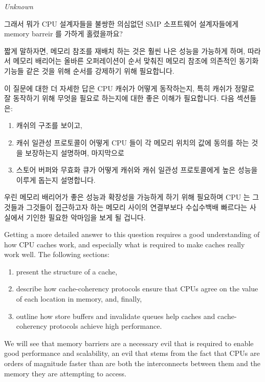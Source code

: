 
%
	 {\emph{Unknown}}

그래서 뭐가 CPU 설계자들을 불쌍한 의심없던 SMP 소프트웨어 설계자들에게
memory barreir 를 가하게 홀렸을까요?

짧게 말하자면, 메모리 참조를 재배치 하는 것은 훨씬 나은 성능을 가능하게
하며, 따라서 메모리 배리어는 올바른 오퍼레이션이 순서 맞춰진 메모리 참조에
의존적인 동기화 기능들 같은 것을 위해 순서를 강제하기 위해 필요합니다.

\iffalse

So what possessed CPU designers to cause them to inflict memory barriers
on poor unsuspecting SMP software designers?

In short, because reordering memory references allows much better performance,
and so memory barriers are needed to force ordering in things like
synchronization primitives whose correct operation depends on ordered
memory references.

\fi

이 질문에 대한 더 자세한 답은 CPU 캐쉬가 어떻게 동작하는지, 특히 캐쉬가 정말로
잘 동작하기 위해 무엇을 필요로 하는지에 대한 좋은 이해가 필요합니다.
다음 섹션들은:
\begin{enumerate}
\item	캐쉬의 구조를 보이고,
\item	캐쉬 일관성 프로토콜이 어떻게 CPU 들이 각 메모리 위치의 값에 동의를
	하는 것을 보장하는지 설명하며, 마지막으로
\item	스토어 버퍼와 무효화 큐가 어떻게 캐쉬와 캐쉬 일관성 프로토콜에게 높은
	성능을 이루게 돕는지 설명합니다.
\end{enumerate}
우린 메모리 배리어가 좋은 성능과 확장성을 가능하게 하기 위해 필요하며 CPU 는
그것들과 그것들이 접근하고자 하는 메모리 사이의 연결부보다 수십수백배 빠르다는
사실에서 기인한 필요한 악마임을 보게 될 겁니다.

\iffalse

Getting a more detailed answer to this question requires a good understanding
of how CPU caches work, and especially what is required to make
caches really work well.
The following sections:
\begin{enumerate}
\item	present the structure of a cache,
\item	describe how cache-coherency protocols ensure that CPUs agree
	on the value of each location in memory, and, finally,
\item	outline how store buffers and invalidate queues help
	caches and cache-coherency protocols achieve high performance.
\end{enumerate}
We will see that memory barriers are a necessary evil that is required
to enable good performance and scalability, an evil that stems from
the fact that CPUs are orders of magnitude faster than are both the
interconnects between them and the memory they are attempting to access.

